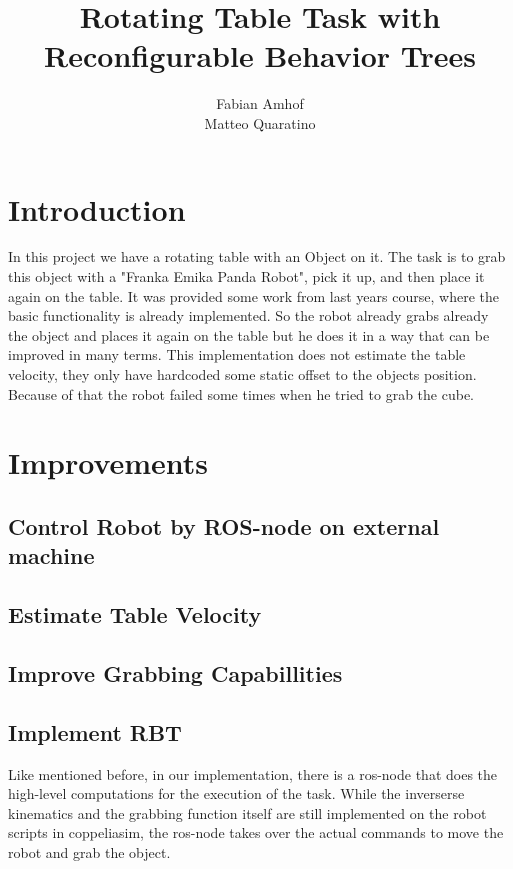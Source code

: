 \documentclass[report]{iisthesis}
\title{Rotating Table Task with Reconfigurable Behavior Trees}
\author{Fabian Amhof \\ Matteo Quaratino}
\begin{document}
\maketitle
\tableofcontents

\chapter{Introduction}

In this project we have a rotating table with an Object on it. The task is to grab this object with a "Franka Emika Panda Robot", pick it up, and then place it again on the table. It was provided some work from last years course, where the basic functionality is already implemented. So the robot already grabs already the object and places it again on the table but he does it in a way that can be improved in many terms.
This implementation does not estimate the table velocity, they only have hardcoded some static offset to the objects position. Because of that the robot failed some times when he tried to grab the cube. 

\chapter{Improvements}

\section{Control Robot by ROS-node on external machine}

\section{Estimate Table Velocity}

\section{Improve Grabbing Capabillities}

\section{Implement RBT}
Like mentioned before, in our implementation, there is a ros-node that does the high-level computations for the execution of the task. While the inverserse kinematics and the grabbing function itself are still implemented on the robot scripts in coppeliasim, the ros-node takes over the actual commands to move the robot and grab the object.
\end{document}
